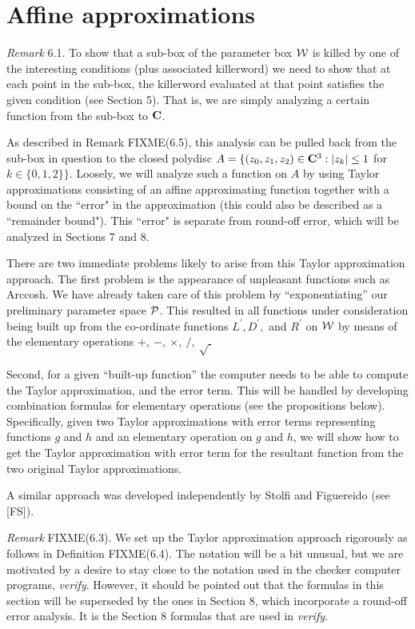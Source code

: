 \section{Affine approximations}

 
{\it Remark} 6.1.
To show that a sub-box of the parameter box ${\cal W}$ is killed by one of the interesting conditions (plus associated killerword) we need to show that at each point in the sub-box, the killerword evaluated at that point satisfies the given condition (see
Section 5).  That is, we are simply analyzing a certain function from the sub-box to ${\bf C}$.  

As described in Remark FIXME(6.5), this analysis can be pulled back from the sub-box in question to the closed polydisc 
$A = \{(z_0,z_1,z_2) \in {\bf C}^3 : |z_k| \le 1$  for $k \in \{0,1,2\}\}.$  
Loosely,  we will analyze such a function on $A$ by using  Taylor approximations consisting of an affine approximating
function together with a bound on the ``error" in the approximation (this could also be described as a ``remainder bound").  This ``error" 
is separate from round-off error,  which will be analyzed in Sections 7 and 8.  

There are two immediate problems likely to arise from this Taylor approximation approach.
The first problem is the appearance of unpleasant functions such as 
Arccosh.  We have already taken care of this problem by ``exponentiating'' our preliminary parameter space ${\cal P}$.  This resulted in all functions under consideration being built up from the co-ordinate functions $ L^{\prime}, D^{\prime},$ and $ R^{\prime}$ on ${\cal W}$ by means of the elementary operations $+,\ -,\ \times,\ /,\ \sqrt.$ 

Second,  for a given ``built-up function'' the computer needs to be able to compute the Taylor approximation, and the error term.  This will be handled 
by developing combination formulas for elementary operations (see the propositions below).  Specifically, given two Taylor
approximations with error terms representing functions $g$ and $h$ and an elementary operation on $g$ and $h$, we will show how to
get the Taylor approximation with error term for the resultant function from the two original Taylor approximations. 

A similar approach was developed independently by Stolfi and Figuereido (see [FS]).
\enddemo

{\it Remark} FIXME(6.3).
We set up the Taylor approximation approach rigorously
as follows in Definition FIXME(6.4).
The notation will be a bit unusual, but we are motivated by a desire to stay close to the notation used in the checker computer programs, {\it verify}.  However, it should be pointed out that the formulas in this
section will be superseded by the ones in Section 8, which incorporate a round-off error analysis.  It is the Section 8 formulas that are
used in {\it verify}.


